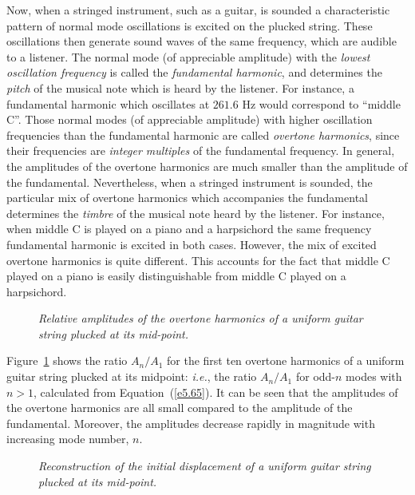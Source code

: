 Now, when a stringed
instrument, such as a guitar, is  sounded a characteristic pattern of normal
mode oscillations is excited on the plucked string. These oscillations then generate 
sound waves of the same frequency, which are audible to a listener. 
The  normal mode (of appreciable amplitude) with the {\em lowest oscillation
frequency}\/ is called the {\em fundamental harmonic}, and  determines the
{\em pitch}\/ of the musical note which is heard by the listener. For instance, a fundamental
harmonic which oscillates at $261.6$ Hz would correspond to ``middle C''. Those normal
modes (of appreciable amplitude) with higher oscillation frequencies than the
fundamental harmonic are called {\em overtone harmonics}, since their
 frequencies are {\em integer multiples}\/ of the fundamental frequency.  In general, the
amplitudes of the overtone harmonics are much smaller than the amplitude of the fundamental. Nevertheless, when a stringed instrument is sounded, the particular mix of overtone harmonics which accompanies the
fundamental  determines
the {\em timbre}\/ of the musical note heard by the listener. For instance, when middle C
is played on a piano and a harpsichord the same frequency fundamental harmonic is excited 
in both cases. However, the mix of excited overtone harmonics  is quite different. This
accounts for the fact that middle C played on a piano is easily distinguishable from middle C
played on a harpsichord. 


\begin{figure}
\epsfysize=3in
\centerline{}
\caption{\em Relative amplitudes of the overtone harmonics of a uniform guitar string
plucked at its mid-point.}\label{f5.9}   
\end{figure}

Figure~\ref{f5.9} shows the ratio $A_n/A_1$ for the first ten overtone harmonics
of a uniform guitar string plucked at its midpoint: {\em i.e.}, the ratio $A_n/A_1$
for odd-$n$ modes with $n>1$, calculated from Equation~(\ref{e5.65}).  It can be seen that the amplitudes
of the overtone harmonics are all small compared to the amplitude of the
fundamental. Moreover, the amplitudes  decrease rapidly in magnitude with increasing
mode number, $n$.

\begin{figure}
\epsfysize=3in
\centerline{}
\caption{\em Reconstruction of the initial displacement of a uniform guitar
string plucked at its mid-point.}\label{f5.10}   
\end{figure}

